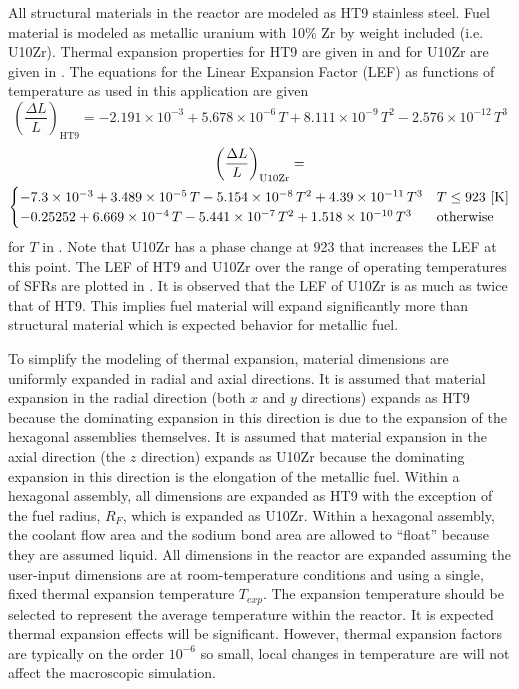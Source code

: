  All structural materials in the reactor are modeled as HT9 stainless steel.
  Fuel material is modeled as metallic uranium with 10\% Zr by weight included
  (i.e. U10Zr). Thermal expansion properties for HT9 are given in \cite{ht9Prop}
  and for U10Zr are given in \cite{thexpU10Zr}. The equations for the Linear
  Expansion Factor (LEF) as functions of temperature as used in this application 
  are given
  \begin{equation}
    \label{eq:lef_ht9}
    \left( \frac{\Delta L}{L} \right)_{\text{HT9}} = 
      -2.191 \times 10^{-3} + 5.678 \times 10^{-6} \, T + 
      8.111 \times 10^{-9} \, T^2 - 2.576 \times 10^{-12} \, T^3 
  \end{equation}
  \begin{multline}
    \label{eq:lef_u10zr}
    \left( \frac{\Delta L}{L} \right)_{\text{U10Zr}} = \\
      \begin{cases}
        -7.3 \times 10^{-3} + 3.489 \times 10^{-5} \, T 
          - 5.154 \times 10^{-8} \, T^2 + 4.39 \times 10^{-11} \, T^3 & 
          T \le 923 \,\left[\text{{K}}\right] \\
        -0.25252 + 6.669 \times 10^{-4} \, T - 5.441 \times 10^{-7} \, T^2 
          + 1.518 \times 10^{-10} \, T^3 & \text{otherwise}
      \end{cases}
  \end{multline}
  for $T$ in . Note that U10Zr has a phase change at 923  that 
  increases the LEF at this point. The LEF of HT9 and U10Zr over the range of
  operating temperatures of SFRs are plotted in .  It is 
  observed that the LEF of U10Zr is as much as twice that of HT9. This implies
  fuel material will expand significantly more than structural material which is
  expected behavior for metallic fuel.

  To simplify the modeling of thermal expansion, material dimensions are
  uniformly expanded in radial and axial directions. It is assumed that material
  expansion in the radial direction (both $x$ and $y$ directions) expands
  as HT9 because the dominating expansion in this direction is
  due to the expansion of the hexagonal assemblies themselves. It is assumed 
  that material expansion in the axial direction (the $z$ direction) expands
  as U10Zr because the dominating expansion in this direction is the elongation
  of the metallic fuel. Within a hexagonal assembly, all dimensions are expanded
  as HT9 with the exception of the fuel radius, $R_F$, which is expanded as 
  U10Zr. Within a hexagonal assembly, the coolant flow area and the sodium bond
  area are allowed to ``float'' because they are assumed liquid. All dimensions
  in the reactor are expanded assuming the user-input dimensions are at
  room-temperature conditions and using a single, fixed thermal expansion
  temperature $T_{exp}$. The expansion temperature should be selected to
  represent the average temperature within the reactor. It is expected thermal
  expansion effects will be significant. However, thermal expansion factors are
  typically on the order $10^{-6}$ so small, local changes in temperature are
  will not affect the macroscopic simulation.

